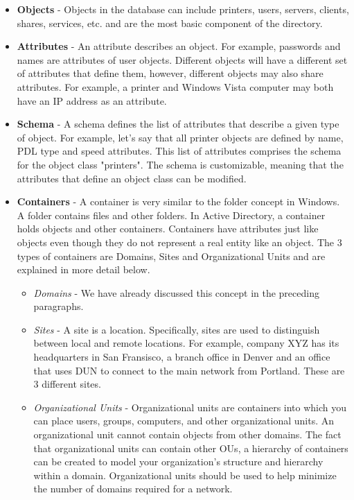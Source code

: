 \begin{itemize}
    \item \textbf{Objects} - Objects in the database can include printers, users, servers, clients, shares, services, etc. and are the most basic component of the directory.
    \item \textbf{Attributes} - An attribute describes an object. For example, passwords and names are attributes of user objects. Different objects will have a different set of attributes that define them, however, different objects may also share attributes. For example, a printer and Windows Vista computer may both have an IP address as an attribute.
    \item \textbf{Schema} - A schema defines the list of attributes that describe a given type of object. For example, let's say that all printer objects are defined by name, PDL type and speed attributes. This list of attributes comprises the schema for the object class "printers". The schema is customizable, meaning that the attributes that define an object class can be modified.
    \item \textbf{Containers} - A container is very similar to the folder concept in Windows. A folder contains files and other folders. In Active Directory, a container holds objects and other containers. Containers have attributes just like objects even though they do not represent a real entity like an object. The 3 types of containers are Domains, Sites and Organizational Units and are explained in more detail below.
    \begin{itemize}
        \item \textit{Domains} - We have already discussed this concept in the preceding paragraphs.
        \item \textit{Sites} - A site is a location. Specifically, sites are used to distinguish between local and remote locations. For example, company XYZ has its headquarters in San Fransisco, a branch office in Denver and an office that uses DUN to connect to the main network from Portland. These are 3 different sites.
        \item \textit{Organizational Units} - Organizational units are containers into which you can place users, groups, computers, and other organizational units. An organizational unit cannot contain objects from other domains. The fact that organizational units can contain other OUs, a hierarchy of containers can be created to model your organization's structure and hierarchy within a domain. Organizational units should be used to help minimize the number of domains required for a network.
    \end{itemize}
\end{itemize}
